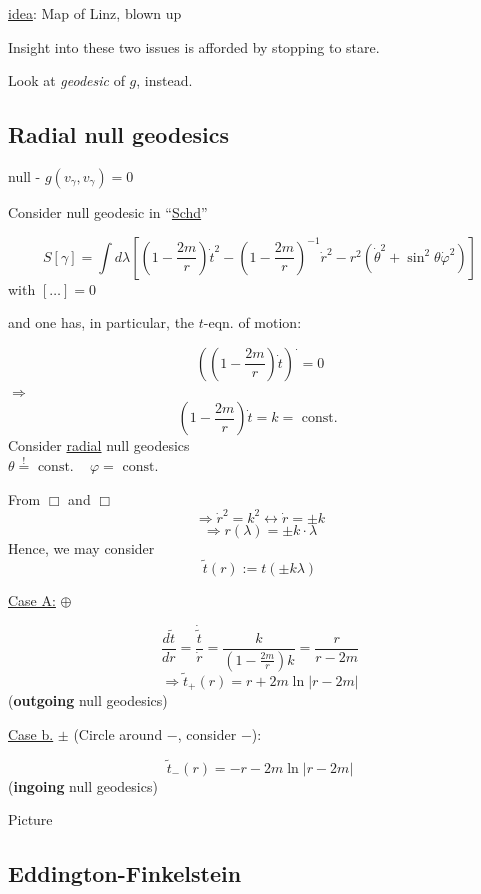 \documentclass[10pt]{amsart}
\begin{document}
\begin{multicols*}{2}
\begin{enumerate}
		\underline{idea}: Map of Linz, blown up
		
		Insight into these two issues is afforded by stopping to stare.  
		
		Look at \emph{geodesic} of $g$, instead.
		
	\end{enumerate}
	
	\subsection{Radial null geodesics}
	
	null - $g(v_{\gamma},v_{\gamma} ) = 0$
	
	Consider null geodesic in ``\underline{Schd}''
	
	\[
	S[\gamma ] = \int d\lambda \left[ \left( 1 - \frac{2m}{r} \right)\dot{t}^2 - \left(1 - \frac{2m}{r} \right)^{-1} \dot{r}^2 - r^2( \dot{\theta}^2 + \sin^2{\theta} \dot{\varphi}^2 ) \right]
	\]
	with $[\dots ] =0$
	
	and one has, in particular, the $t$-eqn. of motion:
	
	\[
	\left( \left( 1-  \frac{2m}{r} \right) \dot{t} \right)^{.} = 0
	\]
	$\Longrightarrow$
	\[
	\boxed{ \left( 1 - \frac{2m}{r} \right)\dot{t} = k } = \text{ const. }
	\]
	Consider \underline{radial} null geodesics \\
	$\theta \overset{!}{=} \text{ const. }$ \quad \quad \, $\varphi = \text{ const. }$
	
	From $\Box $ and $\Box $
	\[
	\Longrightarrow \dot{r}^2 = k^2 \leftrightarrow \dot{r} = \pm k
	\]
	\[
	\Longrightarrow r(\lambda) = \pm k \cdot \lambda
	\]
	Hence, we may consider 
	\[
	\widetilde{t}(r) := t(\pm k\lambda)
	\]
	
	\underline{Case A:} $\oplus$
	
	\[
	\frac{d\widetilde{t}}{dr} = \frac{ \dot{ \widetilde{t}} }{ \dot{r}} = \frac{k}{ \left( 1 - \frac{2m}{r} \right) k } = \frac{r}{r-2m}
	\]
	\[
	\Longrightarrow \widetilde{t}_+(r) = r + 2m \ln{ |r-2m | }
	\]
	(\textbf{outgoing} null geodesics)
	
	\underline{Case b.} $\pm$ (Circle around $-$, consider $-$):
	
	\[
	\widetilde{t}_-(r) = -r - 2m \ln{ |r - 2m | }
	\]
	(\textbf{ingoing} null geodesics)
	
	Picture
	
	\subsection{Eddington-Finkelstein}
	

\end{multicols*}
\end{document}
